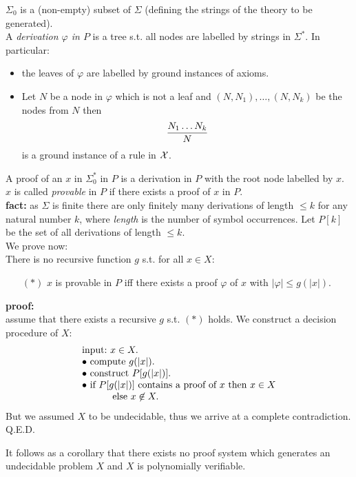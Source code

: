 \documentclass[12pt]{article}
\begin{document}
$\Sigma_0$ is a (non-empty) subset of $\Sigma$ (defining the strings of the
theory to be generated).
\\[1ex]
%
A {\em derivation $\varphi$ in $P$} is a tree s.t. all nodes are labelled
by strings in $\Sigma^*$. In particular:
%
\begin{itemize}
\item the leaves of $\varphi$ are labelled by ground instances of axioms.
\item Let $N$ be a node in $\varphi$ which is not a leaf and
    $(N,N_1),\ldots,(N,N_k)$ be the nodes from $N$ then
\[
{N_1 \ldots N_k\over N}
\]
%
is a ground instance of a rule in ${\cal X}$.
\end{itemize}

A proof of an $x$ in $\Sigma_0^*$ in $P$ is a derivation in $P$
with the root node labelled
by $x$. $x$ is called {\em provable} in $P$ if there exists a proof of
$x$ in $P$.\\[1ex]
%
{\bf fact:} as $\Sigma$ is finite there are only finitely many derivations
of length $\leq k$ for any natural number $k$, where {\em length} is the
number of symbol occurrences. Let $P[k]$ be the set of all derivations of
length $\leq k$.\\[1ex]
%
We prove now:\\
There is no recursive function $g$ s.t. for all $x \in X$:
\begin{itemize}
\item[$(*)$] $x$ is provable in $P$ iff there exists a proof $\varphi$ of $x$
    with $|\varphi| \leq g(|x|)$.
\end{itemize}
%
{\bf proof:}\\
assume that there exists a recursive $g$ s.t. $(*)$ holds. We construct a
decision procedure of $X$:
%
\[
\begin{array}{l}
\mbox{input:}\ x \in X.\\
\bullet\ \mbox{compute}\ g(|x|).\\
\bullet\ \mbox{construct}\ P[g(|x|)].\\
\bullet\ \mbox{if } P[g(|x|)] \mbox{ contains a proof of }x \mbox{ then }
    x \in X\\
\hspace*{1cm} \mbox{ else } x \not \in X.
\end{array}
\]
%
But we assumed $X$ to be undecidable, thus we arrive at a complete contradiction. {Q.E.D.}

It follows as a corollary that there exists no proof system which generates an undecidable
problem $X$ and $X$ is polynomially verifiable.
\end{document}
